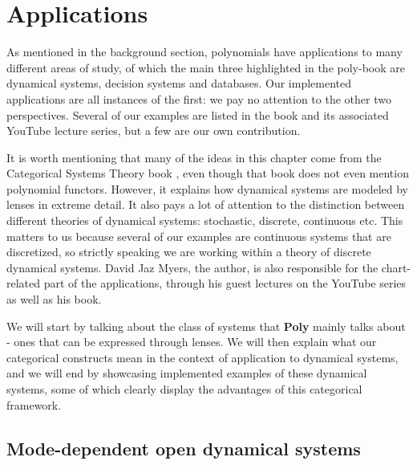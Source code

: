 \chapter{Applications}
\label{chapter:application}
As mentioned in the background section, polynomials have applications to many different areas of study, of which the main three highlighted in the poly-book are dynamical systems, decision systems and databases.
Our implemented applications are all instances of the first: we pay no attention to the other two perspectives.
Several of our examples are listed in the book and its associated YouTube lecture series, but a few are our own contribution.

It is worth mentioning that many of the ideas in this chapter come from the Categorical Systems Theory book \cite{css}, even though that book does not even mention polynomial functors.
However, it explains how dynamical systems are modeled by lenses in extreme detail.
It also pays a lot of attention to the distinction between different theories of dynamical systems: stochastic, discrete, continuous etc.
This matters to us because several of our examples are continuous systems that are discretized, so strictly speaking we are working within a theory of discrete dynamical systems.
David Jaz Myers, the author, is also responsible for the chart-related part of the applications, through his guest lectures on the YouTube series as well as his book.

We will start by talking about the class of systems that \textbf{Poly} mainly talks about - ones that can be expressed through lenses.
We will then explain what our categorical constructs mean in the context of application to dynamical systems, and we will end by showcasing implemented examples of these dynamical systems, some of which clearly display the advantages of this categorical framework.

\newpage

\section{Mode-dependent open dynamical systems}


